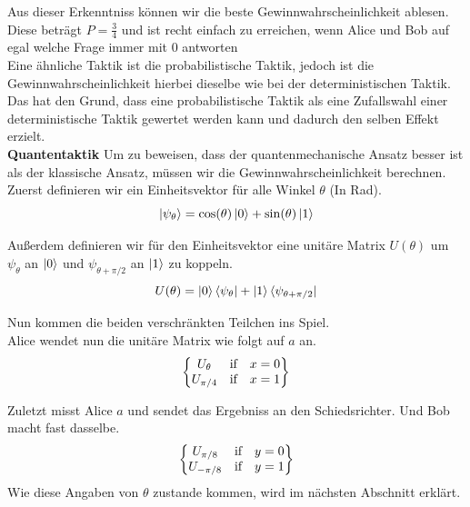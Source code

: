 Aus dieser Erkenntniss können wir die beste Gewinnwahrscheinlichkeit ablesen.
Diese beträgt $P = \frac{3}{4}$ und ist recht einfach zu erreichen, wenn Alice und Bob auf egal welche Frage immer mit $0$ antworten\\

Eine ähnliche Taktik ist die probabilistische Taktik, jedoch ist die Gewinnwahrscheinlichkeit hierbei dieselbe wie bei der deterministischen Taktik.
Das hat den Grund, dass eine probabilistische Taktik als eine Zufallswahl einer deterministische Taktik gewertet werden kann und dadurch den selben Effekt erzielt.\\

\textbf{Quantentaktik}
Um zu beweisen, dass der quantenmechanische Ansatz besser ist als der klassische Ansatz, müssen wir die Gewinnwahrscheinlichkeit berechnen.\\

Zuerst definieren wir ein Einheitsvektor für alle Winkel $\theta$ (In Rad).
\begin{equation}
    \ket{\psi_\theta} = \cos(\theta) \ket{0} + \sin(\theta) \ket{1}
\end{equation}

Außerdem definieren wir für den Einheitsvektor eine unitäre Matrix $U(\theta)$ um $\psi_\theta$ an $\ket{0}$ und $\psi_{\theta+\pi/2}$ an $\ket{1}$ zu koppeln.
\begin{equation}
    U(\theta) = \ket{0}\bra{\psi_\theta} + \ket{1}\bra{\psi_{\theta+\pi/2}}
\end{equation}

Nun kommen die beiden verschränkten Teilchen ins Spiel.\\

Alice wendet nun die unitäre Matrix wie folgt auf $a$ an.
\begin{equation}
    \begin{Bmatrix}
        U_\theta & \hbox{if} & x = 0 \\
        U_{\pi/4} & \hbox{if} & x = 1
    \end{Bmatrix}
\end{equation}

Zuletzt misst Alice $a$ und sendet das Ergebniss an den Schiedsrichter. Und Bob macht fast dasselbe.
\begin{equation}
    \begin{Bmatrix}
        U_{\pi/8} & \hbox{if} & y = 0 \\
        U_{-\pi/8} & \hbox{if} & y = 1
    \end{Bmatrix}
\end{equation}
Wie diese Angaben von $\theta$ zustande kommen, wird im nächsten Abschnitt erklärt.\\

